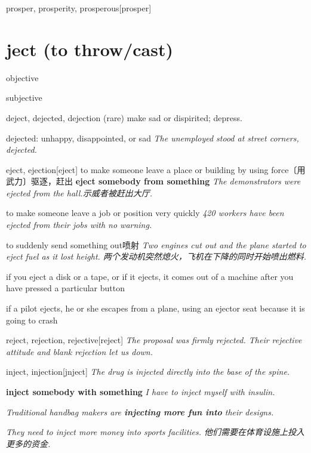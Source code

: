 \begin{DefWord}{prosper, prosperity, prosperous}[prosper]
\end{DefWord}

\section{ject (to throw/cast)}

\begin{DefWord}{objective}
\end{DefWord}

\begin{DefWord}{subjective}
\end{DefWord}

\begin{DefWord}{deject, dejected, dejection}
    (rare) make sad or dispirited; depress.

    dejected: unhappy, disappointed, or sad
    \textit{The unemployed stood at street corners, dejected.}
\end{DefWord}

\begin{DefWord}{eject, ejection}[eject]
    to make someone leave a place or building by using force〔用武力〕驱逐，赶出
    \textbf{eject somebody from something}
    \textit{The demonstrators were ejected from the hall.示威者被赶出大厅. }

    to make someone leave a job or position very quickly
    \textit{420 workers have been ejected from their jobs with no warning.}

    to suddenly send something out喷射
    \textit{Two engines cut out and the plane started to eject fuel as it lost height. 两个发动机突然熄火，飞机在下降的同时开始喷出燃料. }

    if you eject a disk or a tape, or if it ejects, it comes out of a machine after you have pressed a particular button

    if a pilot ejects, he or she escapes from a plane, using an ejector seat because it is going to crash
\end{DefWord}

\begin{DefWord}{reject, rejection, rejective}[reject]
    \textit{The proposal was firmly rejected. Their rejective attitude and blank rejection let us down.}
\end{DefWord}

\begin{DefWord}{inject, injection}[jnject]
    \textit{The drug is injected directly into the base of the spine.}

    \textbf{inject somebody with something}
    \textit{I have to inject myself with insulin.}
    
    \textit{Traditional handbag makers are \textbf{injecting more fun into} their designs.}

    \textit{They need to inject more money into sports facilities. 他们需要在体育设施上投入更多的资金. }
\end{DefWord}



